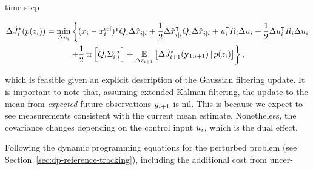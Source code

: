time step
\begin{fullwidth}\vspace{-\baselineskip}
\begin{multline}
  \label{eq:optimal-perturbation-cost}
  \Delta \tilde J_\i^*(p(z_\i)) = \underset{\du_\i}{\min} \left\{ (x_\i -
  \xref_\i)\T \SC_\i
  \dhx_{i|i} + \frac{1}{2}\dhx_{i|i}\T \SC_\i \dhx_{i|i} + u_\i\T \CC_\i \du_\i
  + \frac{1}{2}\du_\i\T \CC_\i \du_\i
    \right. \\ \left.
    + \frac{1}{2} \tr\left[\SC_\i \Sigma^{xx}_{i|i}\right]
    + \underset{\Delta z_{\i+1}}{\Exp} \left[
  \Delta\tilde J_{\i+1}^*(\mathbf{y}_{1:i+1}) \g
  p(z_\i) \right] \right\},
\end{multline}
\end{fullwidth}
which is feasible given an explicit description of the Gaussian filtering
update. It is important to note that, assuming extended Kalman filtering, the
update to the mean from \emph{expected} future observations $y_{i+1}$ is nil.
This is because we expect to see measurements consistent with the current mean
estimate. Nonetheless, the covariance changes depending on the control input
$u_i$, which is the dual effect.

Following the dynamic programming equations for the perturbed problem (see
Section~\ref{sec:dp-reference-tracking}), including the additional cost from
uncer-

